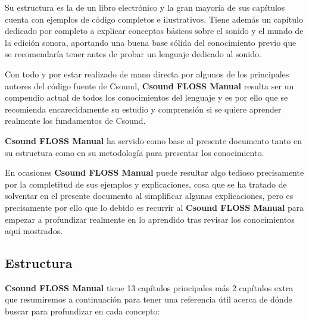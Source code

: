 Su estructura es la de un libro electrónico y la gran mayoría de sus capítulos cuenta con ejemplos de código completos e ilustrativos. Tiene además un capítulo dedicado por completo a explicar conceptos básicos sobre el sonido y el mundo de la edición sonora, aportando una buena base sólida del conocimiento previo que se recomendaría tener antes de probar un lenguaje dedicado al sonido.

Con todo y por estar realizado de mano directa por algunos de los principales autores del código fuente de Csound, \textbf{Csound FLOSS Manual} resulta ser un compendio actual de todos los conocimientos del lenguaje y es por ello que se recomienda encarecidamente su estudio y comprensión si se quiere aprender realmente los fundamentos de Csound.

\textbf{Csound FLOSS Manual} ha servido como base al presente documento tanto en su estructura como en su metodología para presentar los conocimiento.

En ocasiones \textbf{Csound FLOSS Manual} puede resultar algo tedioso precisamente por la completitud de sus ejemplos y explicaciones, cosa que se ha tratado de solventar en el presente documento al simplificar algunas explicaciones, pero es precisamente por ello que lo debido es recurrir al \textbf{Csound FLOSS Manual} para empezar a profundizar realmente en lo aprendido tras revisar los conocimientos aquí mostrados.

\subsection{Estructura}

\textbf{Csound FLOSS Manual} tiene 13 capítulos principales más 2 capítulos extra que resumiremos a continuación para tener una referencia útil acerca de dónde buscar para profundizar en cada concepto:

